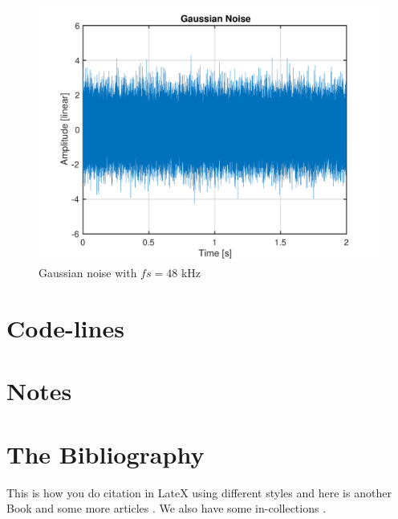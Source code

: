 \documentclass[11pt, a4paper]{article}
\begin{document}
\begin{figure}[H]
	\centering
	\includegraphics[scale=0.6]{plot_Template.pdf}
	\caption{Gaussian noise with $fs = 48$ kHz}
	\label{fig:image1}
\end{figure}

\section{Code-lines}

\section{Notes}

\section{The Bibliography}

This is how you do citation in LateX using different styles \cite{holube2010development} and here is another Book \cite{yost2013hearing} and some more articles \cite{verhey1999within}. We also have some in-collections \cite{bitzer2001superdirective}.




\end{document}
